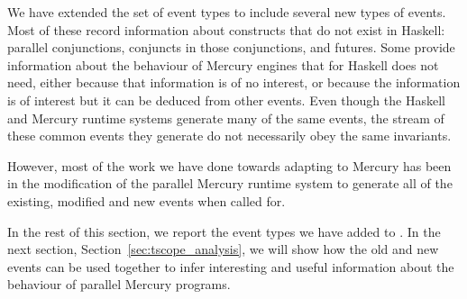 
We have extended the set of \tscope event types
to include several new types of events.
Most of these record information about constructs that do not exist in Haskell:
parallel conjunctions, conjuncts in those conjunctions, and futures.
Some provide information about the behaviour of Mercury engines
that \tscope for Haskell does not need,
either because that information is of no interest,
or because the information is of interest
but it can be deduced from other events.
Even though the Haskell and Mercury runtime systems
generate many of the same events,
the stream of these common events they generate
do not necessarily obey the same invariants.

However, most of the work we have done towards adapting \tscope to Mercury
has been in the modification of the parallel Mercury runtime system
to generate all of the existing, modified and new events when called for.

In the rest of this section,
we report the event types we have added to \tscope.
In the next section, Section~\ref{sec:tscope_analysis},
we will show how the old and new events can be used together
to infer interesting and useful information
about the behaviour of parallel Mercury programs.


